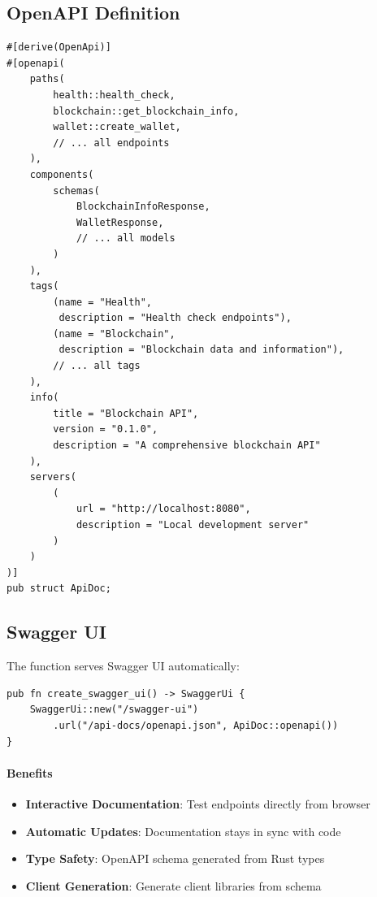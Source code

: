 \subsection{OpenAPI Definition}

\begin{listing}[H]
\caption{OpenAPI definition with Utoipa}
\label{lst:openapi-definition}
\begin{verbatim}
#[derive(OpenApi)]
#[openapi(
    paths(
        health::health_check,
        blockchain::get_blockchain_info,
        wallet::create_wallet,
        // ... all endpoints
    ),
    components(
        schemas(
            BlockchainInfoResponse,
            WalletResponse,
            // ... all models
        )
    ),
    tags(
        (name = "Health",
         description = "Health check endpoints"),
        (name = "Blockchain",
         description = "Blockchain data and information"),
        // ... all tags
    ),
    info(
        title = "Blockchain API",
        version = "0.1.0",
        description = "A comprehensive blockchain API"
    ),
    servers(
        (
            url = "http://localhost:8080",
            description = "Local development server"
        )
    )
)]
pub struct ApiDoc;
\end{verbatim}
\end{listing}

\subsection{Swagger UI}

The  function serves Swagger UI automatically:

\begin{listing}[htbp]
\caption{Swagger UI creation}
\label{lst:swagger-ui}
\begin{verbatim}
pub fn create_swagger_ui() -> SwaggerUi {
    SwaggerUi::new("/swagger-ui")
        .url("/api-docs/openapi.json", ApiDoc::openapi())
}
\end{verbatim}
\end{listing}

\paragraph{Benefits}

\begin{itemize}
  \item \textbf{Interactive Documentation}: Test endpoints directly from browser
  \item \textbf{Automatic Updates}: Documentation stays in sync with code
  \item \textbf{Type Safety}: OpenAPI schema generated from Rust types
  \item \textbf{Client Generation}: Generate client libraries from schema
\end{itemize}

